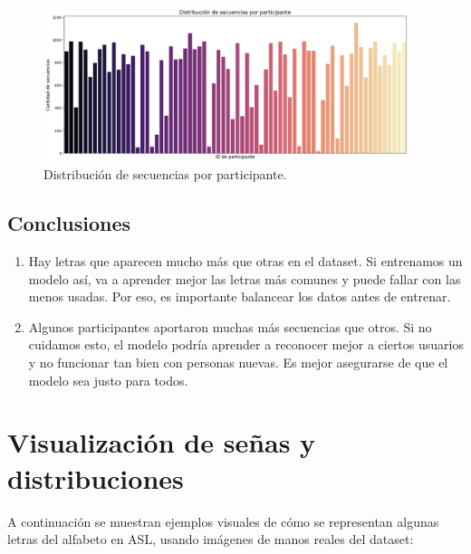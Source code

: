 \documentclass[12pt]{article}
\begin{document}
\begin{figure}[h]
    \centering
    \includegraphics[width=0.95\textwidth]{grafico_participantes.png}
    \caption{Distribución de secuencias por participante.}
    \label{fig:participantes2}
\end{figure}

\subsection*{Conclusiones}
\begin{enumerate}
    \item Hay letras que aparecen mucho más que otras en el dataset. Si entrenamos un modelo así, va a aprender mejor las letras más comunes y puede fallar con las menos usadas. Por eso, es importante balancear los datos antes de entrenar.
    \item Algunos participantes aportaron muchas más secuencias que otros. Si no cuidamos esto, el modelo podría aprender a reconocer mejor a ciertos usuarios y no funcionar tan bien con personas nuevas. Es mejor asegurarse de que el modelo sea justo para todos.
\end{enumerate}


\section{Visualización de señas y distribuciones}

A continuación se muestran ejemplos visuales de cómo se representan algunas letras del alfabeto en ASL, usando imágenes de manos reales del dataset:
\end{document}
